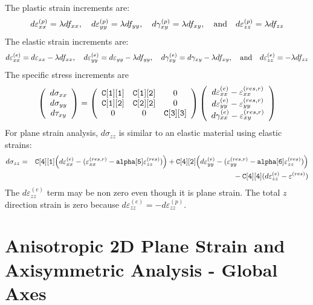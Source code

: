 \documentclass[11pt]{book}
\def\code#1{{\small\tt #1}}
\def\e#1{\varepsilon_{#1}}
\def\er#1{\varepsilon_{#1}^{(res)}}
\def\err#1{\varepsilon_{#1}^{(res,r)}}
\def\g#1{\gamma_{#1}}
\def\s#1{\sigma_{#1}}
\def\t#1{\tau_{#1}}
\def\vvec#1#2#3{\left(\begin{array}{ccc} #1 \\ #2 \\ #3 \end{array}\right)}
\begin{document}
 The plastic strain increments are:
\begin{equation}
       d\varepsilon_{xx}^{(p)} = \lambda df_{xx}, \quad
       d\varepsilon_{yy}^{(p)} = \lambda df_{yy}, \quad
       d\gamma_{xy}^{(p)} =  \lambda df_{xy}, \quad  {\rm and} \quad
       d\varepsilon_{zz}^{(p)} = \lambda df_{zz}
\end{equation}
The elastic strain increments are:
\begin{equation}
       d\varepsilon_{xx}^{(e)} = d\varepsilon_{xx} -\lambda df_{xx}, \quad
       d\varepsilon_{yy}^{(e)} = d\varepsilon_{yy} -\lambda df_{yy}, \quad
       d\gamma_{xy}^{(e)} = d\gamma_{xy} -  \lambda df_{xy}, \quad  {\rm and} \quad
       d\varepsilon_{zz}^{(e)} =  -\lambda df_{zz}
\end{equation}
The specific stress increments are
\begin{equation}
      \vvec{d\s{xx}}{d\s{yy}}{d\t{xy}} = \left(\begin{array}{ccc}
      		\code{C[1][1]} & \code{C[1][2]} & 0 \\
      		\code{C[1][2]} & \code{C[2][2]} &0 \\
      		0 & 0 & \code{C[3][3]} 
           \end{array}\right)
          \vvec{d\varepsilon_{xx}^{(e)}  - \err{xx}}{d\varepsilon_{yy}^{(e)}  -\err{yy}}{d\g{xx}^{(e)}-\err{xy}}
 \end{equation}
For plane strain analysis, $d\sigma_{zz}$ is similar to an elastic material using elastic strains:
 \begin{eqnarray}
     d\s{zz} & = & \code{C[4][1]} \Bigl(d\e{xx}^{(e)} -(\err{xx}-\code{alpha[5]}\er{zz})\Bigr)
                         +  \code{C[4][2]}\Bigl(d\e{yy}^{(e)} -(\err{yy}-\code{alpha[6]}\er{zz})\Bigr) 
     \nonumber \\
     && \qquad\qquad\mbox{}
                   - \code{C[4][4]}(d\e{zz}^{(e)}-\er{})
\end{eqnarray}
The $d\e{zz}^{(e)}$ term may be non zero even though it is plane strain. The total $z$ direction strain is zero because $d\e{zz}^{(e)} = -d\e{zz}^{(p)}$.

\section{Anisotropic 2D Plane Strain and Axisymmetric Analysis - Global Axes}
\end{document}

